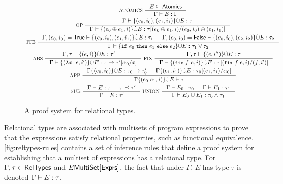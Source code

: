 \begin{figure}
  \centering
  \begin{gather*}
    \inference[ ATOMICS ]{ %
      E \subseteq \atomics %
    }{ \Gamma \judges E : \Gamma } \\
    \inference[ OP ]{ 
      \Gamma \judges %
      \elts{ (e_0, i_0), (e_1, i_1) } \disjunion E : \tau }{ %
      \Gamma \judges \disjadd{ (e_0 \oplus e_1, i) }{ E } : %
      \replace{ \tau }{ (e_0, i_0) \oplus (e_1, i_1) }{ %
        (e_0 \oplus e_1, i) } } \\
    \inference[ ITE ]{ %
      \Gamma, (e_0, i_0) = \true \judges %
      \elts{ (e_0, i_0), (e_1, i_1) } \disjunion E : %
      \tau_1 &
      \Gamma, (e_0, i_0) = \false \judges %
      \elts{ (e_0, i_0), (e_2, i_2) } \disjunion E : %
      \tau_2 }{ %
      \Gamma \judges \disjadd{ \ite{ e_0 }{ e_1 }{ e_2 } }{ E } : %
      \tau_1 \lor \tau_2 } \\
    \inference[ ABS ]{ \Gamma, \tau \judges \disjadd{ (e, i) }{ E } : \tau' &
    }{ %
      \Gamma \judges \disjadd{ (\lambda x.\ e, i') }{ E } : %
      \replace{ \tau \rightarrow \tau' }{ x }{ \alpha_0 } } 
    \inference[ FIX ]{ %
      \Gamma, \tau \judges \disjadd{ (e, i'') }{ E } : \tau }{ %
      \Gamma \judges \disjadd{ ( \fix{ f }{ e }, i ) }{ E } : %
      \replace{ \tau }{ (f, i') }{ ( \fix{ f }{ e }, i ) }
    } \\
    \inference[ APP ]{ %
      \Gamma \disjadd{ (e_0, i_0) }{ E } : \tau_0 \rightarrow \tau_0' & 
      \Gamma \disjadd{ (e_1, i_1) }{ E } : %
      \replace{ \tau_0 }{ \alpha_0 }{ (e_1, i_1) }
    }{ \Gamma \disjadd{ (e_0\ e_1, i) }{ E } \judges \tau } \\
    \inference[ SUB ]{ %
      \Gamma \judges E : \tau & \tau \subtype \tau'
    }{ \Gamma \judges E : \tau' } 
    \inference[ UNION ]{ 
      \Gamma \judges E_0 : \tau_0 &
      \Gamma \judges E_1 : \tau_1 } %
    { \Gamma \judges E_0 \union E_1 : \tau_0 \land \tau_1 } 
  \end{gather*}
  \caption{A proof system for relational types.}
  \label{fig:reltypes-rules}
\end{figure}
%
%
%
Relational types are associated with multisets of program expressions
to prove that the expressions satisfy relational properties, such as
functional equivalence.
%
\autoref{fig:reltypes-rules} contains a set of inference rules that
define a proof system for establishing that a multiset of expressions
has a relational type.
%
For $\Gamma, \tau \in \mathsf{RelTypes}$ and $E \mathsf{MultiSet}[  \mathsf{Exprs}  ]$, the fact
that under $\Gamma$, $E$ has type $\tau$ is denoted $\Gamma \vdash E
: \tau$.

